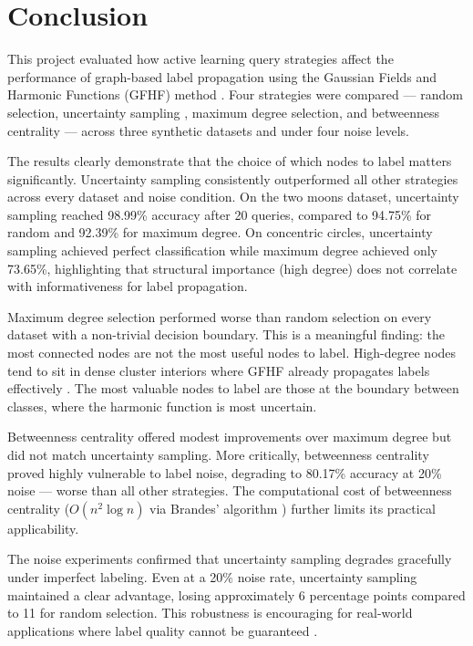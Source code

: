 \documentclass[12pt]{article}
\begin{document}
\section{Conclusion}

This project evaluated how active learning query strategies affect the performance of graph-based label propagation using the Gaussian Fields and Harmonic Functions (GFHF) method \cite{Zhu2003}. Four strategies were compared --- random selection, uncertainty sampling \cite{Lewis1994}, maximum degree selection, and betweenness centrality \cite{Freeman1977} --- across three synthetic datasets and under four noise levels.

The results clearly demonstrate that the choice of which nodes to label matters significantly. Uncertainty sampling consistently outperformed all other strategies across every dataset and noise condition. On the two moons dataset, uncertainty sampling reached 98.99\% accuracy after 20 queries, compared to 94.75\% for random and 92.39\% for maximum degree. On concentric circles, uncertainty sampling achieved perfect classification while maximum degree achieved only 73.65\%, highlighting that structural importance (high degree) does not correlate with informativeness for label propagation.

Maximum degree selection performed worse than random selection on every dataset with a non-trivial decision boundary. This is a meaningful finding: the most connected nodes are not the most useful nodes to label. High-degree nodes tend to sit in dense cluster interiors where GFHF already propagates labels effectively \cite{Zhu2003}. The most valuable nodes to label are those at the boundary between classes, where the harmonic function is most uncertain.

Betweenness centrality \cite{Freeman1977} offered modest improvements over maximum degree but did not match uncertainty sampling. More critically, betweenness centrality proved highly vulnerable to label noise, degrading to 80.17\% accuracy at 20\% noise --- worse than all other strategies. The computational cost of betweenness centrality ($O(n^2 \log n)$ via Brandes' algorithm \cite{Brandes2001}) further limits its practical applicability.

The noise experiments confirmed that uncertainty sampling degrades gracefully under imperfect labeling. Even at a 20\% noise rate, uncertainty sampling maintained a clear advantage, losing approximately 6 percentage points compared to 11 for random selection. This robustness is encouraging for real-world applications where label quality cannot be guaranteed \cite{Fang2014}.
\end{document}
